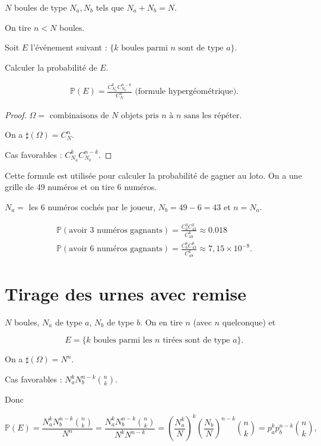 \documentclass[french]{book}
\theoremstyle{definition}
\theoremstyle{remark}
\newcommand{\lesss}{<}
\newcommand{\less}{\lesss}
\begin{document}
$N$ boules de type $N_a, N_b$ tels que $N_a + N_b = N$.

On tire $n \less N$ boules.

Soit $E$ l'événement suivant : $\{ k \text{ boules parmi } n \text{ sont de type } a \}$.

Calculer la probabilité de $E$.

\begin{gather*}
  \mathbb{P}( E ) = \frac{C _{N_a} ^{k} C _{N_b} ^{n-k}}{C_N ^{n}} \text{ (formule hypergéométrique).}
\end{gather*}

\begin{proof}
  $\Omega = \text{ combinaisons de } N \text{ objets pris } n \text{ à } n \text{ sans les répéter. }   $

  On a $\sharp(\Omega) = C_N ^{n}$.

  Cas favorables : $C _{N_a} ^{k} C _{N_b}^{n-k}$.
\end{proof}

Cette formule est utilisée pour calculer la probabilité de gagner au loto. On a une grille de 49 numéros et on tire 6 numéros.

$N_a =$ les 6 numéros cochés par le joueur, $N_b = 49-6 = 43$ et $n=N_a$.

\begin{gather*}
  \mathbb{P}( \text{avoir 3 numéros gagnants} ) = \frac{C^{3}_{6} C^{3}_{43}}{C^{6}_{49}} \approx 0.018 \\
  \mathbb{P}( \text{avoir 6 numéros gagnants} ) = \frac{C^{6}_{6} C^{0}_{43}}{C_{49}^{6}} \approx 7,15 \times 10 ^{-8}.
\end{gather*}

\section{Tirage des urnes avec remise}

$N$ boules, $N_a$ de type $a$, $N_b$ de type $b$. On en tire $n$ (avec $n$ quelconque) et

\begin{equation*}
  E = \{ k \text{ boules parmi les } n \text{ tirées sont de type } a  \}.
\end{equation*}

On a $\sharp(\Omega) = N ^{n}$.

Cas favorables : $N_a ^{k} N_b ^{n-k} \binom{n}{k}$.

Donc

\begin{equation*}
  \mathbb{P}( E ) = \frac{N_a ^{k} N_b ^{n-k} \binom{n}{k}}{N ^{n}} = \frac{N_a ^{k} N_b ^{n-k} \binom{n}{k}}{N ^{k} N ^{n-k}} = \left( \frac{N_a ^{k}}{N}\right) ^{k} \left( \frac{N_b}{N}\right) ^{n-k} \binom{n}{k} = p_a ^{k} p_b ^{n-k} \binom{n}{k},
\end{equation*}
\end{document}
